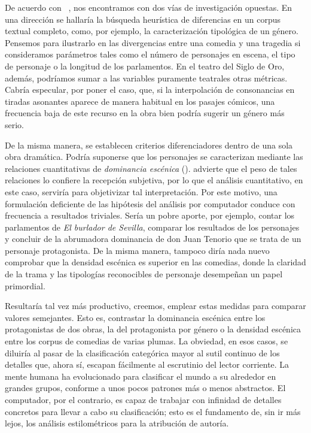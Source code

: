 De acuerdo con \citeauthor{ilsemann1998}~\parencite*[15-16]{ilsemann1998}, nos encontramos con dos vías de investigación opuestas. En una dirección se hallaría la búsqueda heurística de diferencias en un corpus textual completo, como, por ejemplo, la caracterización tipológica de un género. Pensemos para ilustrarlo en las divergencias entre una comedia y una tragedia si consideramos parámetros tales como el número de personajes en escena, el tipo de personaje o la longitud de los parlamentos. En el teatro del Siglo de Oro, además, podríamos sumar a las variables puramente teatrales otras métricas. Cabría especular, por poner el caso, que, si la interpolación de consonancias en tiradas asonantes aparece de manera habitual en los pasajes cómicos, una frecuencia baja de este recurso en la obra bien podría sugerir un género más serio.

De la misma manera, se establecen criterios diferenciadores dentro de una sola obra dramática. Podría suponerse que los personajes se caracterizan mediante las relaciones cuantitativas de \textit{dominancia escénica} (). \citeauthor{ilsemann1998} advierte que el peso de tales relaciones lo confiere la recepción subjetiva, por lo que el análisis cuantitativo, en este caso, serviría para objetivizar tal interpretación. Por este motivo, una formulación deficiente de las hipótesis del análisis por computador conduce con frecuencia a resultados triviales. Sería un pobre aporte, por ejemplo, contar los parlamentos de \textit{El burlador de Sevilla}, comparar los resultados de los personajes y concluir de la abrumadora dominancia de don Juan Tenorio que se trata de un personaje protagonista. De la misma manera, tampoco diría nada nuevo comprobar que la densidad escénica es superior en las comedias, donde la claridad de la trama y las tipologías reconocibles de personaje desempeñan un papel primordial.

Resultaría tal vez más productivo, creemos, emplear estas medidas para comparar valores semejantes. Esto es, contrastar la dominancia escénica entre los protagonistas de dos obras, la del protagonista por género o la densidad escénica entre los corpus de comedias de varias plumas. La obviedad, en esos casos, se diluiría al pasar de la clasificación categórica mayor al sutil continuo de los detalles que, ahora sí, escapan fácilmente al escrutinio del lector corriente. La mente humana ha evolucionado para clasificar el mundo a su alrededor en grandes grupos, conforme a unos pocos patrones más o menos abstractos. El computador, por el contrario, es capaz de trabajar con infinidad de detalles concretos para llevar a cabo su clasificación; esto es el fundamento de, sin ir más lejos, los análisis estilométricos para la atribución de autoría. 

